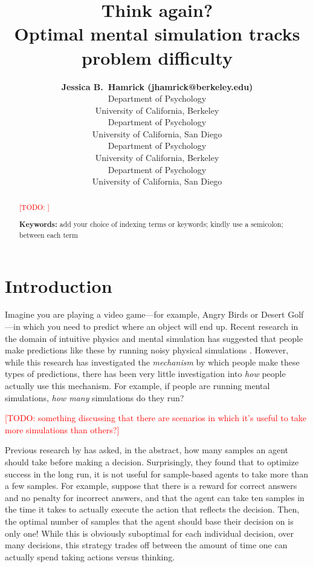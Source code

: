\documentclass[10pt,letterpaper]{article}
\title{Think again?\\ Optimal mental simulation tracks problem difficulty}
\author{{\large \bf Jessica B.~Hamrick (jhamrick@berkeley.edu)} \\
  Department of Psychology \\
  University of California, Berkeley
  \AND {\large \bf Kevin A.~Smith (k2smith@ucsd.edu)} \\
  Department of Psychology \\
  University of California, San Diego
  \AND {\large \bf Thomas L.~Griffiths (tom\_griffiths@berkeley.edu)} \\
  Department of Psychology \\
  University of California, Berkeley
  \AND {\large \bf Edward Vul (evul@ucsd.edu)} \\
  Department of Psychology \\
  University of California, San Diego}
\newcommand{\TODO}[1]{\textcolor{red}{[TODO: #1]}}
\begin{document}
\maketitle

\begin{abstract}
\TODO{}

\textbf{Keywords:} 
add your choice of indexing terms or keywords; kindly use a
semicolon; between each term
\end{abstract}

\section{Introduction}

Imagine you are playing a video game---for example, Angry Birds or Desert Golf---in which you need to predict where an object will end up. Recent research in the domain of intuitive physics and mental simulation has suggested that people make predictions like these by running noisy physical simulations \cite{Smith2012,Battaglia2013,Smith:2013ug,Smith:2013th,Smith:2014tx,Ullman:2014ut,Hamrick:2015}. However, while this research has investigated the \emph{mechanism} by which people make these types of predictions, there has been very little investigation into \emph{how} people actually use this mechanism. For example, if people are running mental simulations, \emph{how many} simulations do they run?

\TODO{something discussing that there are scenarios in which it's useful to take more simulations than others?}

Previous research by  has asked, in the abstract, how many samples an agent should take before making a decision. Surprisingly, they found that to optimize success in the long run, it is not useful for sample-based agents to take more than a few samples. For example, suppose that there is a reward for correct answers and no penalty for incorrect answers, and that the agent can take ten samples in the time it takes to actually execute the action that reflects the decision. Then, the optimal number of samples that the agent should base their decision on is only one! While this is obviously suboptimal for each individual decision, over many decisions, this strategy trades off between the amount of time one can actually spend taking actions versus thinking.
\end{document}
